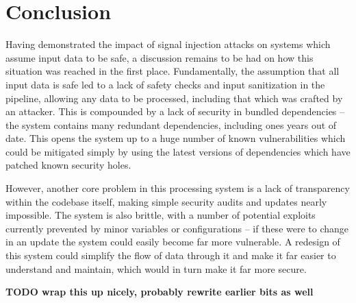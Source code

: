 \section{Conclusion}

Having demonstrated the impact of signal injection attacks on systems which assume input data to be safe, a discussion remains to be had on how this situation was reached in the first place.
Fundamentally, the assumption that all input data is safe led to a lack of safety checks and input sanitization in the pipeline, allowing any data to be processed, including that which was crafted by an attacker.
This is compounded by a lack of security in bundled dependencies -- the system contains many redundant dependencies, including ones years out of date.
This opens the system up to a huge number of known vulnerabilities which could be mitigated simply by using the latest versions of dependencies which have patched known security holes.

However, another core problem in this processing system is a lack of transparency within the codebase itself, making simple security audits and updates nearly impossible.
The system is also brittle, with a number of potential exploits currently prevented by minor variables or configurations -- if these were to change in an update the system could easily become far more vulnerable.
A redesign of this system could simplify the flow of data through it and make it far easier to understand and maintain, which would in turn make it far more secure.

\textbf{TODO wrap this up nicely, probably rewrite earlier bits as well}
